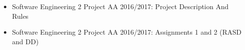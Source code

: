 \begin{itemize}
	\item Software Engineering 2 Project AA 2016/2017: Project Description And Rules
	\item Software Engineering 2 Project AA 2016/2017: Assignments 1 and 2 (RASD and DD) 
	
\end{itemize}
